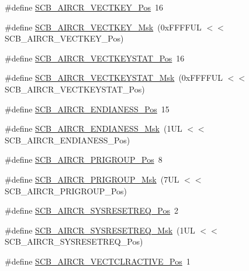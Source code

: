 \begin{DoxyCompactItemize}
\item 
\#define \hyperlink{group___c_m_s_i_s___s_c_b_gaaa27c0ba600bf82c3da08c748845b640}{\-S\-C\-B\-\_\-\-A\-I\-R\-C\-R\-\_\-\-V\-E\-C\-T\-K\-E\-Y\-\_\-\-Pos}~16
\item 
\#define \hyperlink{group___c_m_s_i_s___s_c_b_ga90c7cf0c490e7ae55f9503a7fda1dd22}{\-S\-C\-B\-\_\-\-A\-I\-R\-C\-R\-\_\-\-V\-E\-C\-T\-K\-E\-Y\-\_\-\-Msk}~(0x\-F\-F\-F\-F\-U\-L $<$$<$ S\-C\-B\-\_\-\-A\-I\-R\-C\-R\-\_\-\-V\-E\-C\-T\-K\-E\-Y\-\_\-\-Pos)
\item 
\#define \hyperlink{group___c_m_s_i_s___s_c_b_gaec404750ff5ca07f499a3c06b62051ef}{\-S\-C\-B\-\_\-\-A\-I\-R\-C\-R\-\_\-\-V\-E\-C\-T\-K\-E\-Y\-S\-T\-A\-T\-\_\-\-Pos}~16
\item 
\#define \hyperlink{group___c_m_s_i_s___s_c_b_gabacedaefeefc73d666bbe59ece904493}{\-S\-C\-B\-\_\-\-A\-I\-R\-C\-R\-\_\-\-V\-E\-C\-T\-K\-E\-Y\-S\-T\-A\-T\-\_\-\-Msk}~(0x\-F\-F\-F\-F\-U\-L $<$$<$ S\-C\-B\-\_\-\-A\-I\-R\-C\-R\-\_\-\-V\-E\-C\-T\-K\-E\-Y\-S\-T\-A\-T\-\_\-\-Pos)
\item 
\#define \hyperlink{group___c_m_s_i_s___s_c_b_gad31dec98fbc0d33ace63cb1f1a927923}{\-S\-C\-B\-\_\-\-A\-I\-R\-C\-R\-\_\-\-E\-N\-D\-I\-A\-N\-E\-S\-S\-\_\-\-Pos}~15
\item 
\#define \hyperlink{group___c_m_s_i_s___s_c_b_ga2f571f93d3d4a6eac9a3040756d3d951}{\-S\-C\-B\-\_\-\-A\-I\-R\-C\-R\-\_\-\-E\-N\-D\-I\-A\-N\-E\-S\-S\-\_\-\-Msk}~(1\-U\-L $<$$<$ S\-C\-B\-\_\-\-A\-I\-R\-C\-R\-\_\-\-E\-N\-D\-I\-A\-N\-E\-S\-S\-\_\-\-Pos)
\item 
\#define \hyperlink{group___c_m_s_i_s___s_c_b_gaca155deccdeca0f2c76b8100d24196c8}{\-S\-C\-B\-\_\-\-A\-I\-R\-C\-R\-\_\-\-P\-R\-I\-G\-R\-O\-U\-P\-\_\-\-Pos}~8
\item 
\#define \hyperlink{group___c_m_s_i_s___s_c_b_ga8be60fff03f48d0d345868060dc6dae7}{\-S\-C\-B\-\_\-\-A\-I\-R\-C\-R\-\_\-\-P\-R\-I\-G\-R\-O\-U\-P\-\_\-\-Msk}~(7\-U\-L $<$$<$ S\-C\-B\-\_\-\-A\-I\-R\-C\-R\-\_\-\-P\-R\-I\-G\-R\-O\-U\-P\-\_\-\-Pos)
\item 
\#define \hyperlink{group___c_m_s_i_s___s_c_b_gaffb2737eca1eac0fc1c282a76a40953c}{\-S\-C\-B\-\_\-\-A\-I\-R\-C\-R\-\_\-\-S\-Y\-S\-R\-E\-S\-E\-T\-R\-E\-Q\-\_\-\-Pos}~2
\item 
\#define \hyperlink{group___c_m_s_i_s___s_c_b_gaae1181119559a5bd36e62afa373fa720}{\-S\-C\-B\-\_\-\-A\-I\-R\-C\-R\-\_\-\-S\-Y\-S\-R\-E\-S\-E\-T\-R\-E\-Q\-\_\-\-Msk}~(1\-U\-L $<$$<$ S\-C\-B\-\_\-\-A\-I\-R\-C\-R\-\_\-\-S\-Y\-S\-R\-E\-S\-E\-T\-R\-E\-Q\-\_\-\-Pos)
\item 
\#define \hyperlink{group___c_m_s_i_s___s_c_b_gaa30a12e892bb696e61626d71359a9029}{\-S\-C\-B\-\_\-\-A\-I\-R\-C\-R\-\_\-\-V\-E\-C\-T\-C\-L\-R\-A\-C\-T\-I\-V\-E\-\_\-\-Pos}~1
$$
\end{DoxyCompactItemize}
